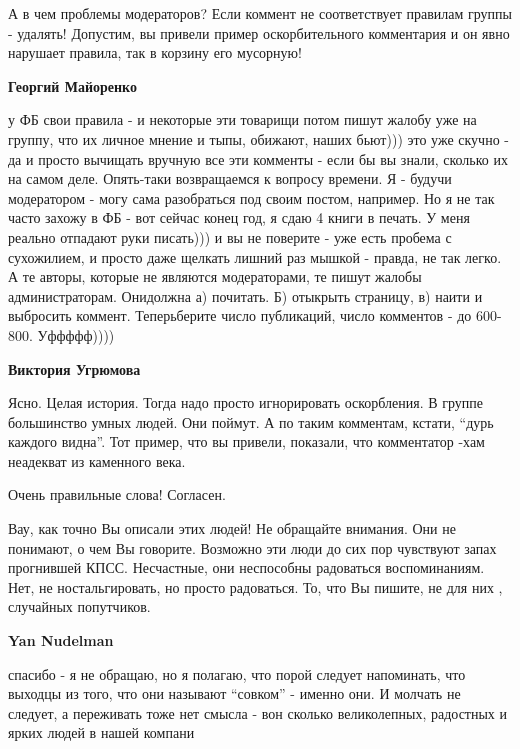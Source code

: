\begin{itemize}
\begin{itemize}
\begin{itemize}
А в чем проблемы модераторов? Если коммент не соответствует правилам группы -
удалять! Допустим, вы привели пример оскорбительного комментария и он явно
нарушает правила, так в корзину его мусорную!

\textbf{Георгий Майоренко} 

у ФБ свои правила - и некоторые эти товарищи потом пишут жалобу уже на группу,
что их личное мнение и тыпы, обижают, наших бьют))) это уже скучно - да и
просто вычищать вручную все эти комменты - если бы вы знали, сколько их на
самом деле. Опять-таки возвращаемся к вопросу времени. Я - будучи модератором -
могу сама разобраться под своим постом, например. Но я не так часто захожу в ФБ
- вот сейчас конец год, я сдаю 4 книги в печать. У меня реально отпадают руки
писать))) и вы не поверите - уже есть пробема с сухожилием, и просто даже
щелкать лишний раз мышкой - правда, не так легко. А те авторы, которые не
являются модераторами, те пишут жалобы администраторам. Онидолжна а) почитать.
Б) отыкрыть страницу, в) наити и выбросить коммент. Теперьберите число
публикаций, число комментов - до 600-800. Уффффф))))

\textbf{Виктория Угрюмова} 

Ясно. Целая история. Тогда надо просто игнорировать оскорбления. В группе
большинство умных людей. Они поймут. А по таким комментам, кстати, \enquote{дурь
каждого видна}. Тот пример, что вы привели, показали, что комментатор -хам
неадекват из каменного века.

\end{itemize} %

\end{itemize} %

Очень правильные слова! Согласен.


Вау, как точно Вы описали этих людей! Не обращайте внимания. Они не понимают, о
чем Вы говорите. Возможно эти люди до сих пор чувствуют запах прогнившей КПСС.
Несчастные, они неспособны радоваться воспоминаниям. Нет, не ностальгировать,
но просто радоваться. То, что Вы пишите, не для них , случайных попутчиков.

\begin{itemize} %
\textbf{Yan Nudelman} 

спасибо - я не обращаю, но я полагаю, что порой следует напоминать, что выходцы
из того, что они называют \enquote{совком} - именно они. И молчать не следует, а
переживать тоже нет смысла - вон сколько великолепных, радостных и ярких людей
в нашей компани


\end{itemize}
\end{itemize}
